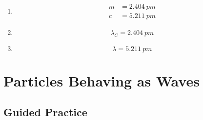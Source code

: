 \documentclass{article}
\begin{document}
\begin{enumerate}
  \item

        \begin{align*}
          m & = \qty{2.404}{pm} \\
          c & = \qty{5.211}{pm}
        \end{align*}

  \item \[\lambda_C = \qty{2.404}{pm}\]

  \item \[\lambda = \qty{5.211}{pm}\]
\end{enumerate}

\section{Particles Behaving as Waves}

\subsection{Guided Practice}

\subsubsection{}
\end{document}
